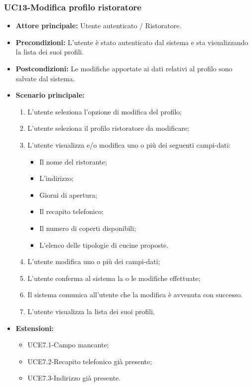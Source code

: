 \subsubsection{UC13-Modifica profilo ristoratore}
\begin{itemize}
\item \textbf{Attore principale:} Utente autenticato / Ristoratore.
\item \textbf{Precondizioni:} L'utente è stato autenticato dal sistema e sta visualizzando la lista dei suoi profili.
\item \textbf{Postcondizioni:} Le modifiche apportate ai dati relativi al profilo sono salvate dal sistema.
\item \textbf{Scenario principale:}
\begin{enumerate}
    \item L'utente seleziona l'opzione di modifica del profilo;
    \item L'utente seleziona il profilo ristoratore da modificare;
    \item L'utente visualizza e/o modifica uno o più dei seguenti campi-dati:
        \begin{itemize}
            \item Il nome del ristorante;
            \item L'indirizzo;
            \item Giorni di apertura;
            \item Il recapito telefonico;
            \item Il numero di coperti disponibili;
            \item L'elenco delle tipologie di cucine proposte.
        \end{itemize}
    \item L'utente modifica uno o più dei campi-dati;
    \item L'utente conferma al sistema la o le modifiche effettuate;
    \item Il sistema comunica all'utente che la modifica è avvenuta con successo.
    \item L'utente visualizza la lista dei suoi profili.
\end{enumerate}
        \item \textbf{Estensioni:}
        \begin{itemize}
                \item UCE7.1-Campo mancante;
                \item UCE7.2-Recapito telefonico già presente;
                \item UCE7.3-Indirizzo già presente.
        \end{itemize}
\end{itemize}

